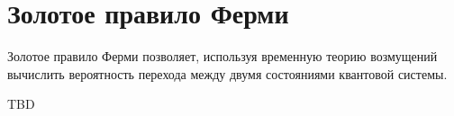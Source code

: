 \section{Золотое правило Ферми}
\label{addQuantGoldenRuleFermi}
Золотое правило Ферми позволяет, используя временную теорию возмущений
вычислить вероятность перехода между двумя состояниями квантовой
системы.

TBD
